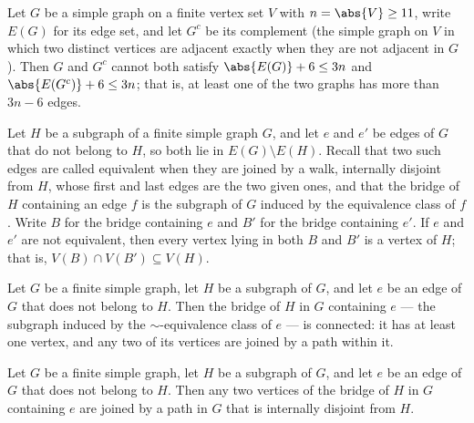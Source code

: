 \begin{theorem}
\label{SimpleGraph.not_both_card_edge_le_of_eleven_le}
\leanok
Let $G$ be a simple graph on a finite vertex set $V$ with $n = \abs{V} \ge 11$, write
$E(G)$ for its edge set, and let $G^{c}$ be its complement (the simple graph on $V$ in
which two distinct vertices are adjacent exactly when they are not adjacent in $G$).
Then $G$ and $G^{c}$ cannot both satisfy $\abs{E(G)} + 6 \le 3n$ and $\abs{E(G^{c})} + 6
\le 3n$; that is, at least one of the two graphs has more than $3n - 6$ edges.
\end{theorem}

\begin{theorem}
\label{SimpleGraph.bridge_inter_subset_cycle}
\leanok
{}
Let $H$ be a subgraph of a finite simple graph $G$, and let $e$ and $e'$ be edges of $G$
that do not belong to $H$, so both lie in $E(G)\setminus E(H)$. Recall that two such
edges are called equivalent when they are joined by a walk, internally disjoint from
$H$, whose first and last edges are the two given ones, and that the bridge of $H$
containing an edge $f$ is the subgraph of $G$ induced by the equivalence class of $f$.
Write $B$ for the bridge containing $e$ and $B'$ for the bridge containing $e'$. If $e$
and $e'$ are not equivalent, then every vertex lying in both $B$ and $B'$ is a vertex of
$H$; that is, $V(B)\cap V(B')\subseteq V(H)$.
\end{theorem}

\begin{theorem}
\label{SimpleGraph.bridgeOf_connected}
\leanok
{}
Let $G$ be a finite simple graph, let $H$ be a subgraph of $G$, and let $e$ be an edge
of $G$ that does not belong to $H$. Then the bridge of $H$ in $G$ containing $e$ — the
subgraph induced by the $\sim$-equivalence class of $e$ — is connected: it has at least
one vertex, and any two of its vertices are joined by a path within it.
\end{theorem}

\begin{theorem}
\label{SimpleGraph.exists_path_internallyDisjoint}
\leanok
{}
Let $G$ be a finite simple graph, let $H$ be a subgraph of $G$, and let $e$ be an edge
of $G$ that does not belong to $H$. Then any two vertices of the bridge of $H$ in $G$
containing $e$ are joined by a path in $G$ that is internally disjoint from $H$.
\end{theorem}

